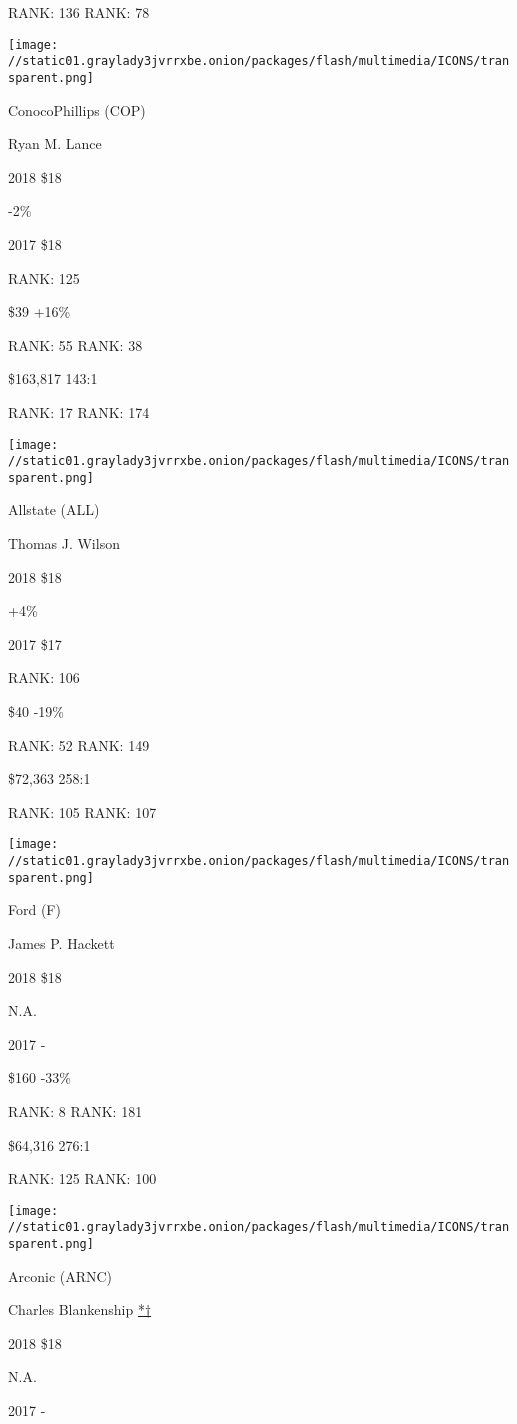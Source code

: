 RANK: 136 RANK: 78

\texttt{[image: //static01.graylady3jvrrxbe.onion/packages/flash/multimedia/ICONS/transparent.png]}

ConocoPhillips (COP)

Ryan M. Lance \protect\hyperlink{g-footnotes}{}

2018 \$18

 -2\%

2017 \$18

RANK: 125

 \$39 +16\%

RANK: 55 RANK: 38

 \$163,817 143:1

RANK: 17 RANK: 174

\texttt{[image: //static01.graylady3jvrrxbe.onion/packages/flash/multimedia/ICONS/transparent.png]}

Allstate (ALL)

Thomas J. Wilson \protect\hyperlink{g-footnotes}{}

2018 \$18

 +4\%

2017 \$17

RANK: 106

 \$40 -19\%

RANK: 52 RANK: 149

 \$72,363 258:1

RANK: 105 RANK: 107

\texttt{[image: //static01.graylady3jvrrxbe.onion/packages/flash/multimedia/ICONS/transparent.png]}

Ford (F)

James P. Hackett \protect\hyperlink{g-footnotes}{}

2018 \$18

 N.A.

2017 -

 \$160 -33\%

RANK: 8 RANK: 181

 \$64,316 276:1

RANK: 125 RANK: 100

\texttt{[image: //static01.graylady3jvrrxbe.onion/packages/flash/multimedia/ICONS/transparent.png]}

Arconic (ARNC)

Charles Blankenship \protect\hyperlink{g-footnotes}{*†}

2018 \$18

 N.A.

2017 -

